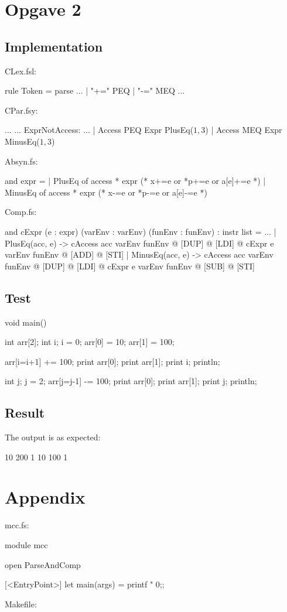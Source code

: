 \section{Opgave 2}
\subsection{Implementation}
CLex.fsl:
\begin{fs}
rule Token = parse
...
  | "+="            { PEQ }
  | "-="            { MEQ }
...
\end{fs}
CPar.fsy:
\begin{fs}
...
...
ExprNotAccess:
...
  | Access PEQ Expr                     { PlusEq($1, $3)      } 
  | Access MEQ Expr                     { MinusEq($1, $3)     } 

\end{fs}
Absyn.fs:
\begin{fs}
and expr =                                                         
  | PlusEq of access * expr          (* x+=e or *p+=e or a[e]+=e    *)
  | MinusEq of access * expr         (* x-=e or *p-=e or a[e]-=e    *)
\end{fs}
Comp.fs:
\begin{fs}
and cExpr (e : expr) (varEnv : varEnv) (funEnv : funEnv) : instr list = 
...
    | PlusEq(acc, e)  -> cAccess acc varEnv funEnv @ [DUP] @ [LDI] @ cExpr e varEnv funEnv @ [ADD] @ [STI]
    | MinusEq(acc, e)  -> cAccess acc varEnv funEnv @ [DUP] @ [LDI] @ cExpr e varEnv funEnv @ [SUB] @ [STI]
\end{fs}

\subsection{Test}
\begin{ccode}
void main() {
    int arr[2];
    int i;
    i = 0;
    arr[0] = 10;
    arr[1] = 100;
    
    arr[i=i+1] += 100;
    print arr[0];
    print arr[1];
    print i;
    println;

    int j;
    j = 2;
    arr[j=j-1] -= 100;
    print arr[0];
    print arr[1];
    print j;
    println;
}
\end{ccode}
\subsection{Result}
The output is as expected:
\begin{bashcode}
10 200 1 
10 100 1
\end{bashcode}

\pagebreak
\section{Appendix}
mcc.fs:
\begin{fs}
module mcc

open ParseAndComp

[<EntryPoint>]
let main(args) =
    printf "%
    0;;
\end{fs}
Makefile:


